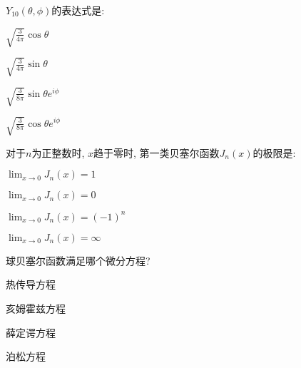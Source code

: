 \documentclass{njustexam}
\begin{document}
\begin{problem}
  $Y_{10}(\theta,  \phi)$的表达式是:
\begin{abcd}
  \item $\sqrt{\frac{3}{4\pi}} \cos \theta$
  \item $\sqrt{\frac{3}{4\pi}} \sin \theta$
  \item $\sqrt{\frac{3}{8\pi}} \sin \theta e^{i\phi}$
  \item $\sqrt{\frac{3}{8\pi}} \cos \theta e^{i\phi}$
\end{abcd}
\end{problem}



\begin{problem}
  对于$n$为正整数时, $x$趋于零时, 第一类贝塞尔函数$J_n(x)$的极限是:

  \begin{abcd}
\item $\lim_{x \to 0} J_n(x) = 1$

\item $\lim_{x \to 0} J_n(x) = 0$

\item $\lim_{x \to 0} J_n(x) = (-1)^n$

\item $\lim_{x \to 0} J_n(x) = \infty$
 \end{abcd}
\end{problem}


\begin{problem}
  球贝塞尔函数满足哪个微分方程? 

  \begin{abcd}
    \item 热传导方程
    \item 亥姆霍兹方程
    \item 薛定谔方程
    \item 泊松方程
  \end{abcd}
\end{problem}
\end{document}
